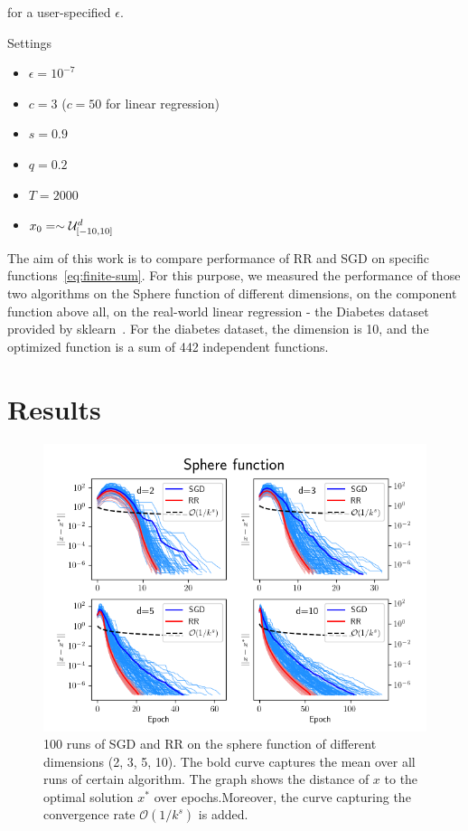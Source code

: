 \documentclass[10pt,conference,compsocconf]{IEEEtran}
\begin{document}
\noindent for a user-specified $\epsilon$.

\noindent Settings

\begin{itemize}
\item $\epsilon = 10^{-7}$
\item $c = 3$ ($c=50$ for linear regression)
\item $s = 0.9$
\item $q = 0.2$
\item $T = 2000$
\item $x_0 = \sim {\cal U}_{[-10, 10]}^d$
\end{itemize}

The aim of this work is to compare performance of RR and SGD on
specific functions~\ref{eq:finite-sum}. For this purpose, we measured the
performance of those two algorithms on the Sphere function of different
dimensions, on the component function above all, on the real-world
linear regression - the Diabetes dataset provided by
sklearn~\cite{DIABETES,SKLEARN}. For the diabetes dataset, the dimension
is 10, and the optimized function is a sum of 442 independent functions.

\section{Results}

\begin{figure}
  \centering
  \includegraphics[width=\columnwidth]{sphere_runs}
  \caption{100 runs of SGD and RR on the sphere function of different
  dimensions (2, 3, 5, 10). The bold curve captures the mean over all
  runs of certain algorithm. The graph shows the distance of $x$
  to the optimal solution $x^*$ over epochs.Moreover, the curve
  capturing the convergence rate $\mathcal{O}(1 / k^s)$ is added.}
  \vspace{-3mm}
  \label{fig:sphere1}
\end{figure}
\end{document}
